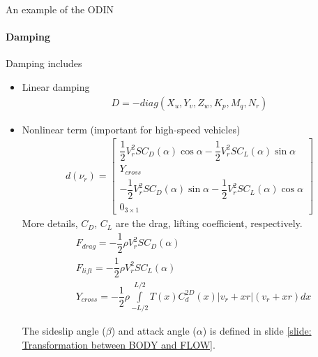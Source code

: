 \begin{frame}{An example of the ODIN}
	\framesubtitle{Damping}
	Damping includes
	\begin{itemize}
		\item Linear damping 
		\begin{align}
			D = -diag(X_u, Y_v, Z_w, K_p, M_q, N_r)
		\end{align}
		\item Nonlinear term (important for high-speed vehicles)
		\begin{align}
			d(\nu_r) = \begin{bmatrix}
				\dfrac{1}{2}V_r^2S C_D(\alpha)\cos\alpha - \dfrac{1}{2}V_r^2S C_L(\alpha)\sin\alpha \\
				Y_{cross}\\
				-\dfrac{1}{2}V_r^2S C_D(\alpha)\sin\alpha - \dfrac{1}{2}V_r^2S C_L(\alpha)\cos\alpha \\
				0_{3\times 1}
			\end{bmatrix}
		\end{align}
		More details, $C_D$, $C_L$ are the drag, lifting coefficient, respectively.
		\begin{align}
			&F_{drag} = -\dfrac{1}{2}\rho V_r^2 S C_D(\alpha)\\
			&F_{lift} = -\dfrac{1}{2}\rho V_r^2 S C_L(\alpha)\\
			&Y_{cross} = -\dfrac{1}{2}\rho
			\int\limits_{-L/2}^{L/2}T(x)C_d^{2D}(x)|v_r + xr|(v_r + xr)dx
		\end{align}
		
		The sideslip angle ($\beta$) and attack angle ($\alpha$) is defined in slide \ref{slide: Transformation between BODY and FLOW}.
	\end{itemize}
\end{frame}





